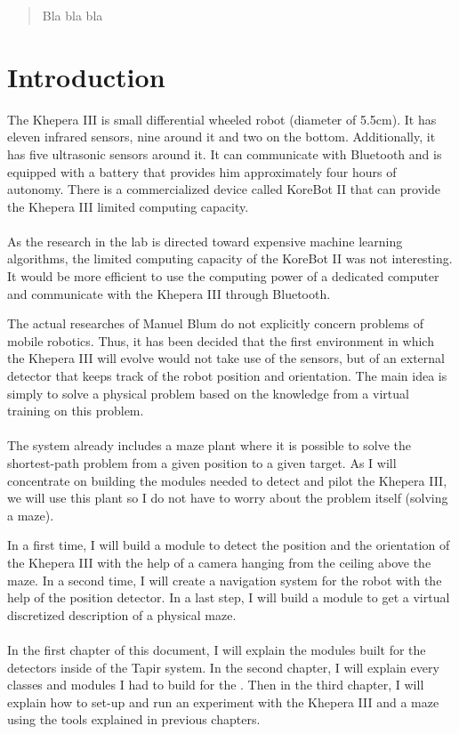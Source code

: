 \begin{abstract}
Bla bla bla
\end{abstract}

\chapter{Introduction}

The Khepera III is small differential wheeled robot (diameter of 5.5cm). 
It has eleven infrared sensors, nine around it and two on the bottom. 
Additionally, it has five ultrasonic sensors around it. It can communicate 
with Bluetooth and is equipped with a battery that provides him 
approximately four hours of autonomy. There is a commercialized device 
called KoreBot II that can provide the Khepera III limited computing 
capacity. 
\\
\\
As the research in the lab is directed toward expensive machine learning 
algorithms, the limited computing capacity of the KoreBot II was not 
interesting. It would be more efficient to use the computing power of 
a dedicated computer and communicate with the Khepera III through 
Bluetooth.

The actual researches of Manuel Blum do not explicitly concern problems 
of mobile robotics. Thus, it has been decided that the first environment 
in which the Khepera III will evolve would not take use of the sensors, 
but of an external detector that keeps track of the robot position and 
orientation. The main idea is simply to solve a physical problem based 
on the knowledge from a virtual training on this problem.
\\
\\
The \clsquare system already includes a maze plant where it is possible 
to solve the shortest-path problem from a given position to a given 
target. As I will concentrate on building the modules needed to detect 
and pilot the Khepera III, we will use this plant so I do not have to 
worry about the problem itself (solving a maze).

In a first time, I will build a module to detect the position and the 
orientation of the Khepera III with the help of a camera hanging from 
the ceiling above the maze. In a second time, I will create a navigation 
system for the robot with the help of the position detector. In a last 
step, I will build a module to get a virtual discretized description of 
a physical maze.
\\
\\
In the first chapter of this document, I will explain the modules built 
for the detectors inside of the Tapir system. In the second chapter, 
I will explain every classes and modules I had to build for the \clsquare. 
Then in the third chapter, I will explain how to set-up and run an 
experiment with the Khepera III and a maze using the tools explained 
in previous chapters. 
